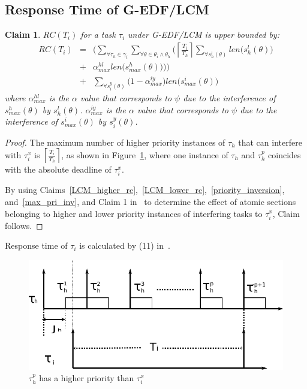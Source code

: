\documentclass[a4paper,english]{article}
\newtheorem{clm}{Claim}
\newtheorem{proof}{Proof}
\begin{document}
\subsection{\label{response g-edf/lcm} Response Time of G-EDF/LCM}


\begin{clm}\label{GEDF/LCM response time}
$RC(T_i)$ for a task $\tau_i$ under G-EDF/LCM is upper bounded by:
\begin{eqnarray}
RC(T_i) & = & \Bigg(\sum_{\forall \tau_h \in \gamma_i}\sum_{\forall\theta \in \theta_i \wedge \theta_h}\Bigg(\left\lceil\frac{T_{i}}{T_{h}}\right\rceil\sum_{\forall s_{h}^{l}(\theta)}len\Big(s_{h}^{l}(\theta)\Big)\nonumber\\
& + & \alpha_{max}^{hl}len\Big(s_{max}^{h}(\theta)\Big)\Bigg)\Bigg)\nonumber\\
& + & \sum_{\forall s_{i}^{y}(\theta)}\Big(1-\alpha_{max}^{iy}\Big)len\Big(s_{max}^i(\theta)\Big)  
\label{eq78}\end{eqnarray} 
where $\alpha_{max}^{hl}$ is the $\alpha$ value that corresponds to $\psi$ due to the interference of $s_{max}^h(\theta)$ by $s_h^l(\theta)$. $\alpha_{max}^{iy}$ is the $\alpha$ value that corresponds to $\psi$ due to the interference of $s_{max}^i(\theta)$ by $s_i^y(\theta)$.
\end{clm}

\begin{proof}\normalfont
The maximum number of higher priority instances of $\tau_h$ that can interfere with $\tau_i^x$ is $\left\lceil\frac{T_i}{T_h}\right\rceil$, as shown in Figure~\ref{fig17}, where one instance of $\tau_h$ and $\tau_h^p$ coincides with the absolute deadline of $\tau_i^x$.

By using Claims~\ref{LCM_higher_rc},~\ref{LCM_lower_rc},~\ref{priority_inversion}, and~\ref{max_pri_inv}, and Claim 1 in~\cite{stmconcurrencycontrol:emsoft11} to determine the effect of atomic sections belonging to higher and lower priority instances of interfering tasks to $\tau_i^x$, Claim follows.
\end{proof}


Response time of $\tau_{i}$ is calculated by (11) in~\cite{stmconcurrencycontrol:emsoft11}.
\begin{figure}
\begin{centering}
\includegraphics[scale=0.6]{figures/figure18}
\par\end{centering}
\caption{\label{fig17}$\tau_h^p$ has a higher priority than $\tau_i^x$}
\end{figure}
\end{document}
